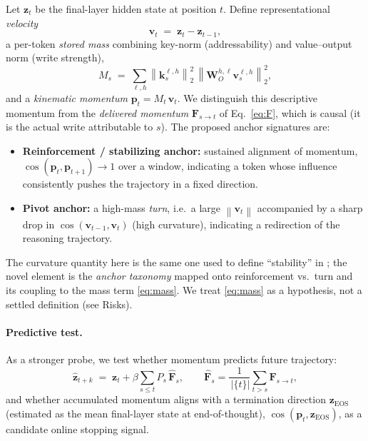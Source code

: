 \documentclass[11pt]{article}
\newcommand{\F}{\mathbf{F}}
\newcommand{\WO}{\mathbf{W}_O}
\newcommand{\vv}{\mathbf{v}}
\newcommand{\kk}{\mathbf{k}}
\newcommand{\zz}{\mathbf{z}}
\newcommand{\pp}{\mathbf{p}}
\newcommand{\norm}[1]{\left\lVert #1 \right\rVert}
\begin{document}
Let $\zz_t$ be the final-layer hidden state at position $t$. Define representational
\emph{velocity}
\begin{equation}
\vv_t \;=\; \zz_t - \zz_{t-1},
\label{eq:velocity}
\end{equation}
a per-token \emph{stored mass} combining key-norm (addressability) and value--output norm
(write strength),
\begin{equation}
M_s \;=\; \sum_{\ell,h}\norm{\kk^{\ell,h}_s}_2^2\,\norm{\WO^{h,\ell}\vv^{\ell,h}_s}_2^2 ,
\label{eq:mass}
\end{equation}
and a \emph{kinematic momentum} $\pp_t = M_t\,\vv_t$. We distinguish this descriptive momentum
from the \emph{delivered momentum} $\F_{s\to t}$ of Eq.~\eqref{eq:F}, which is causal (it is the
actual write attributable to $s$). The proposed anchor signatures are:
\begin{itemize}[leftmargin=1.4em,itemsep=2pt]
\item \textbf{Reinforcement / stabilizing anchor:} sustained alignment of momentum,
$\cos(\pp_t,\pp_{t+1})\to 1$ over a window, indicating a token whose influence consistently
pushes the trajectory in a fixed direction.
\item \textbf{Pivot anchor:} a high-mass \emph{turn}, i.e.\ a large $\norm{\vv_t}$ accompanied by
a sharp drop in $\cos(\vv_{t-1},\vv_t)$ (high curvature), indicating a redirection of the
reasoning trajectory.
\end{itemize}
The curvature quantity here is the same one used to define ``stability'' in
\cite{semstep2026}; the novel element is the \emph{anchor taxonomy} mapped onto reinforcement vs.\
turn and its coupling to the mass term \eqref{eq:mass}. We treat \eqref{eq:mass} as a hypothesis,
not a settled definition (see Risks).

\paragraph{Predictive test.} As a stronger probe, we test whether momentum predicts future
trajectory:
\begin{equation}
\widehat{\zz}_{t+k} \;=\; \zz_t + \beta\sum_{s\le t} P_s\,\widehat{\F}_s,\qquad
\widehat{\F}_s = \frac{1}{\,\lvert\{t\}\rvert}\sum_{t>s}\F_{s\to t},
\label{eq:predict}
\end{equation}
and whether accumulated momentum aligns with a termination direction $\zz_{\mathrm{EOS}}$
(estimated as the mean final-layer state at end-of-thought), $\cos(\pp_t,\zz_{\mathrm{EOS}})$,
as a candidate online stopping signal.
\end{document}
